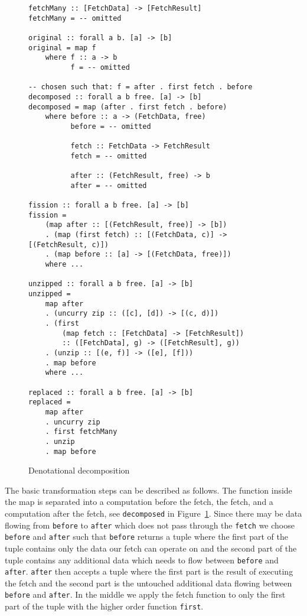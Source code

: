 \begin{figure}[h]
\begin{verbatim}
fetchMany :: [FetchData] -> [FetchResult]
fetchMany = -- omitted

original :: forall a b. [a] -> [b]
original = map f
    where f :: a -> b
          f = -- omitted

-- chosen such that: f = after . first fetch . before
decomposed :: forall a b free. [a] -> [b]
decomposed = map (after . first fetch . before)
    where before :: a -> (FetchData, free)
          before = -- omitted

          fetch :: FetchData -> FetchResult
          fetch = -- omitted

          after :: (FetchResult, free) -> b
          after = -- omitted

fission :: forall a b free. [a] -> [b]
fission =
    (map after :: [(FetchResult, free)] -> [b])
    . (map (first fetch) :: [(FetchData, c)] -> [(FetchResult, c)])
    . (map before :: [a] -> [(FetchData, free)])
    where ...

unzipped :: forall a b free. [a] -> [b]
unzipped =
    map after
    . (uncurry zip :: ([c], [d]) -> [(c, d)])
    . (first
        (map fetch :: [FetchData] -> [FetchResult])
        :: ([FetchData], g) -> ([FetchResult], g))
    . (unzip :: [(e, f)] -> ([e], [f]))
    . map before
    where ...

replaced :: forall a b free. [a] -> [b]
replaced =
    map after
    . uncurry zip
    . first fetchMany
    . unzip
    . map before
\end{verbatim}
\caption{Denotational decomposition}
\label{fig:map-decomposition-in-code}

\end{figure}

The basic transformation steps can be described as follows.
The function inside the map is separated into a computation before the fetch, the fetch, and a computation after the fetch, see \texttt{decomposed} in Figure~\ref{fig:map-decomposition-in-code}.
Since there may be data flowing from \texttt{before} to \texttt{after} which does not pass through the \texttt{fetch} we choose \texttt{before} and \texttt{after} such that \texttt{before} returns a tuple where the first part of the tuple contains only the data our fetch can operate on and the second part of the tuple contains any additional data which needs to flow between \texttt{before} and \texttt{after}.
\texttt{after} then accepts a tuple where the first part is the result of executing the fetch and the second part is the untouched additional data flowing between \texttt{before} and \texttt{after}.
In the middle we apply the fetch function to only the first part of the tuple with the higher order function \texttt{first}.

